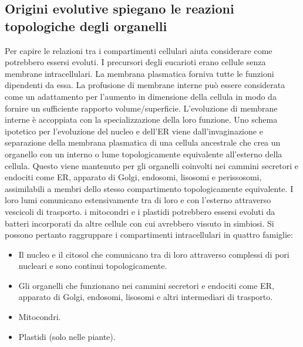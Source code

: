 \subsection{Origini evolutive spiegano le reazioni topologiche degli organelli}
Per capire le relazioni tra i compartimenti cellulari aiuta considerare come potrebbero essersi evoluti. I precursori degli eucarioti erano cellule senza membrane intracellulari. La
membrana plasmatica forniva tutte le funzioni dipendenti da essa. La profusione di membrane interne pu\`o essere considerata come un adattamento per l'aumento in dimensione della
cellula in modo da fornire un sufficiente rapporto volume/superficie. L'evoluzione di membrane interne \`e accoppiata con la specializzazione della loro funzione. Uno schema ipotetico
per l'evoluzione del nucleo e dell'ER viene dall'invaginazione e separazione della membrana plasmatica di una cellula ancestrale che crea un organello con un interno o lume 
topologicamente equivalente all'esterno della cellula. Questo viene mantenuto per gli organelli coinvolti nei cammini secretori e endociti come ER, apparato di Golgi, endosomi, 
lisosomi e perissosomi, assimilabili a membri dello stesso compartimento topologicamente equivalente. I loro lumi comunicano estensivamente tra di loro e con l'esterno attraverso
vescicoli di trasporto. i mitocondri e i plastidi potrebbero essersi evoluti da batteri incorporati da altre cellule con cui avrebbero vissuto in simbiosi. Si possono pertanto 
raggruppare i compartimenti intracellulari in quattro famiglie:
\begin{itemize}
	\item Il nucleo e il citosol che comunicano tra di loro attraverso complessi di pori nucleari e sono continui topologicamente.
	\item Gli organelli che funzionano nei cammini secretori e endociti come ER, apparato di Golgi, endosomi, lisosomi e altri intermediari di trasporto.
	\item Mitocondri.
	\item Plastidi (solo nelle piante).
\end{itemize}
